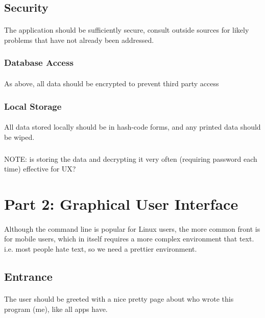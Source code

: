 \documentclass{article}
\begin{document}
	\subsection{Security}
	\paragraph{}
The application should be sufficiently secure, consult outside sources for likely problems that have not already been addressed.

	\subsubsection{Database Access}
	\paragraph{}
As above, all data should be encrypted to prevent third party access

	\subsubsection{Local Storage}
	\paragraph{}
All data stored locally should be in hash-code forms, and any printed data should be wiped.

	\subparagraph{}
NOTE: is storing the data and decrypting it very often (requiring password each time) effective for UX?

	\newpage

	\section{Part 2: Graphical User Interface}
	\paragraph{}
Although the command line is popular for Linux users, the more common front is for mobile users, which in itself requires a more complex environment that text. i.e. most people hate text, so we need a prettier environment.

	\subsection{Entrance}
	\paragraph{}
The user should be greeted with a nice pretty page about who wrote this program (me), like all apps have.
\end{document}
